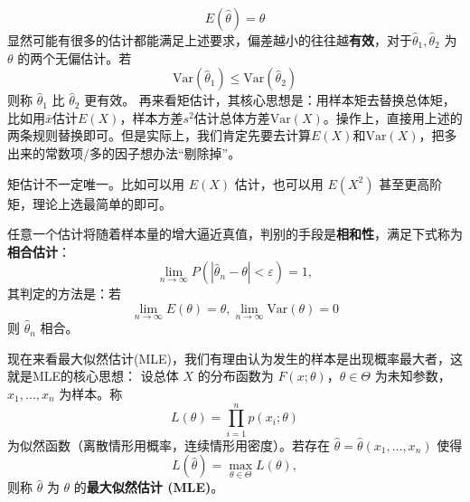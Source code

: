 \documentclass[a4paper]{ctexart}
\begin{document}
\begin{equation}
    E(\hat{\theta}) = \theta    
\end{equation}
显然可能有很多的估计都能满足上述要求，偏差越小的往往越\textbf{有效}，对于\(\hat{\theta}_1, \hat{\theta}_2\) 为 \(\theta\) 的两个无偏估计。若
\begin{equation}
    \mathrm{Var}(\hat{\theta}_1) \le \mathrm{Var}(\hat{\theta}_2)
\end{equation} 
则称 \(\hat{\theta}_1\) 比 \(\hat{\theta}_2\) 更有效。
再来看矩估计，其核心思想是：用样本矩去替换总体矩，比如用$\bar{x}$估计$E(X)$，样本方差$s^2$估计总体方差$\mathrm{Var}(X)$。操作上，直接用上述的两条规则替换即可。但是实际上，我们肯定先要去计算$E(X)$和$\mathrm{Var}(X)$，把多出来的常数项/多的因子想办法“剔除掉”。
\begin{tipbox}
    矩估计不一定唯一。比如可以用 $E(X)$ 估计，也可以用 $E(X^2)$ 甚至更高阶矩，理论上选最简单的即可。
\end{tipbox}
任意一个估计将随着样本量的增大逼近真值，判别的手段是\textbf{相和性}，满足下式称为\textbf{相合估计}：
\begin{equation}
    \lim_{n\to\infty} P(|\hat{\theta}_n - \theta| < \varepsilon) = 1,
\end{equation}
其判定的方法是：若 
\begin{equation}
    \lim\limits_{n\to\infty} E(\theta) = \theta, \lim\limits_{n\to\infty} \mathrm{Var}(\theta) = 0
\end{equation}
则 $\hat{\theta}_n$ 相合。

现在来看最大似然估计(MLE)，我们有理由认为发生的样本是出现概率最大者，这就是MLE的核心思想：
设总体 \(X\) 的分布函数为 \(F(x; \theta)\)，\(\theta \in \Theta\) 为未知参数，\(x_1, \ldots, x_n\) 为样本。称
\[
L(\theta) = \prod_{i=1}^n p(x_i; \theta)
\]
为似然函数（离散情形用概率，连续情形用密度）。若存在 \(\hat{\theta} = \hat{\theta}(x_1, \ldots, x_n)\) 使得
\[
L(\hat{\theta}) = \max_{\theta \in \Theta} L(\theta),
\]
则称 \(\hat{\theta}\) 为 \(\theta\) 的\textbf{最大似然估计 (MLE)}。
\end{document}
